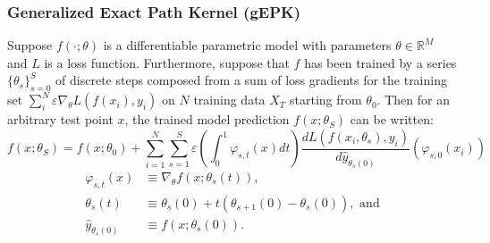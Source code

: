 \begin{frame}
  \frametitle{Generalized Exact Path Kernel (gEPK)}


\begin{theorem}
\label{thm:ekr}
Suppose $f(\cdot; \theta)$ is a differentiable parametric model with parameters $\theta \in \mathbb{R}^M$ and $L$ is a loss function. Furthermore, suppose that $f$ has been trained by a series $\{\theta_s\}_{s=0}^S$ of discrete steps composed from a sum of loss gradients for the training set $ \sum_{i}^N \varepsilon \nabla_\theta L(f(x_i), y_i)$ on $N$ training data $X_T$ starting from $\theta_0$. Then for an arbitrary test point $x$, the trained model prediction $f(x; \theta_S)$ can be written:
\begin{equation}
f(x; \theta_S) = f(x; \theta_0) + \sum_{i=1}^N \sum_{s=1}^S \varepsilon \left(\int_0^1 \varphi_{s,t}(x) dt\right) \dfrac{dL(f(x_i, \theta_s), y_i)}{d \hat y_{\theta_s(0)}} \left(\varphi_{s, 0}(x_i)\right)
\label{exact}
\end{equation}
\begin{align}
    \varphi_{s,t}(x) &\equiv \nabla_\theta f(x; \theta_s(t)), \\
    \theta_s(t) &\equiv \theta_s(0) + t(\theta_{s+1}(0)-\theta_s(0)), \text{ and}\\
    \hat y_{\theta_s(0)} &\equiv f(x; \theta_s(0)).
\end{align}
\end{theorem}
\end{frame}

